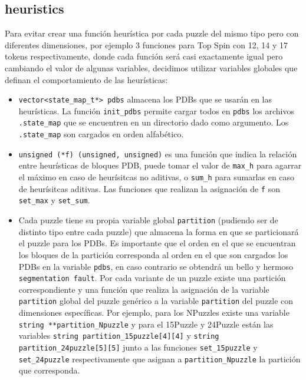 \documentclass[a4paper,10pt]{article}
\begin{document}
  \subsection{heuristics}
    Para evitar crear una funci\'on heur\'istica por cada puzzle del mismo tipo pero 
    con diferentes dimensiones, por ejemplo 3 funciones para Top Spin con 12, 14 y 17 
    tokens respectivamente, donde cada funci\'on ser\'a casi exactamente igual pero 
    cambiando el valor de algunas variables, decidimos utilizar variables globales 
    que definan el comportamiento de las heur\'isticas:

    \begin{itemize}
      \item \verb|vector<state_map_t*> pdbs| almacena los PDBs que se usar\'an en las 
      heur\'isticas. La funci\'on \verb|init_pdbs| permite cargar todos en \verb|pdbs|
      los archivos \verb|.state_map| que se encuentren en un directorio dado como 
      argumento. Los \verb|.state_map| son cargados en orden alfab\'etico. 

      \item \verb|unsigned (*f) (unsigned, unsigned)| es una funci\'on que indica la 
      relaci\'on entre heur\'isticas de bloques PDB, puede tomar el valor de 
      \verb|max_h| para agarrar el m\'aximo en caso de heur\'isitcas no aditivas, o 
      \verb|sum_h| para sumarlas en caso de heur\'isitcas aditivas. Las funciones que 
      realizan la asignaci\'on de \verb|f| son \verb|set_max| y \verb|set_sum|.

      \item Cada puzzle tiene su propia variable global \verb|partition| (pudiendo 
      ser de distinto tipo entre cada puzzle) que almacena la forma en que se 
      particionar\'a el puzzle para los PDBs. Es importante que el orden en el que 
      se encuentran los bloques de la partici\'on corresponda al orden en el que son 
      cargados los PDBs en la variable \verb|pdbs|, en caso contrario se obtendr\'a
      un bello y hermoso \verb|segmentation fault|. Por cada variante de un puzzle 
      existe una partici\'on correspondiente y una funci\'on que realiza la 
      asignaci\'on de la variable \verb|partition| global del puzzle gen\'erico a 
      la variable \verb|partition| del puzzle con dimensiones espec\'ificas. Por 
      ejemplo, para los NPuzzles existe una variable \verb|string **partition_Npuzzle|
      y para el 15Puzzle y 24Puzzle est\'an las variables 
      \verb|string partition_15puzzle[4][4]| y \verb|string partition_24puzzle[5][5]|
      junto a las funciones \verb|set_15puzzle| y \verb|set_24puzzle| respectivamente 
      que asignan a \verb|partition_Npuzzle| la partici\'on que corresponda.
    \end{itemize}
\end{document}
